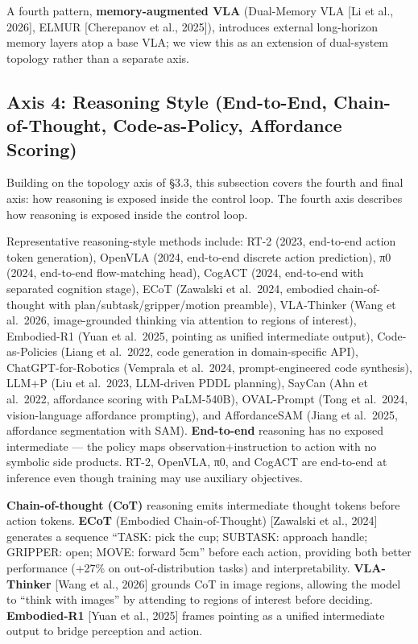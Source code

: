 A fourth pattern, \textbf{memory-augmented VLA} (Dual-Memory VLA {[}Li et al., 2026{]}, ELMUR {[}Cherepanov et al., 2025{]}), introduces external long-horizon memory layers atop a base VLA; we view this as an extension of dual-system topology rather than a separate axis.

\subsection{Axis 4: Reasoning Style (End-to-End, Chain-of-Thought, Code-as-Policy, Affordance Scoring)}\label{axis-4-reasoning-style-end-to-end-chain-of-thought-code-as-policy-affordance-scoring}

Building on the topology axis of §3.3, this subsection covers the fourth and final axis: how reasoning is exposed inside the control loop. The fourth axis describes how reasoning is exposed inside the control loop.

Representative reasoning-style methods include: RT-2 (2023, end-to-end action token generation), OpenVLA (2024, end-to-end discrete action prediction), π0 (2024, end-to-end flow-matching head), CogACT (2024, end-to-end with separated cognition stage), ECoT (Zawalski et al.~2024, embodied chain-of-thought with plan/subtask/gripper/motion preamble), VLA-Thinker (Wang et al.~2026, image-grounded thinking via attention to regions of interest), Embodied-R1 (Yuan et al.~2025, pointing as unified intermediate output), Code-as-Policies (Liang et al.~2022, code generation in domain-specific API), ChatGPT-for-Robotics (Vemprala et al.~2024, prompt-engineered code synthesis), LLM+P (Liu et al.~2023, LLM-driven PDDL planning), SayCan (Ahn et al.~2022, affordance scoring with PaLM-540B), OVAL-Prompt (Tong et al.~2024, vision-language affordance prompting), and AffordanceSAM (Jiang et al.~2025, affordance segmentation with SAM). \textbf{End-to-end} reasoning has no exposed intermediate --- the policy maps observation+instruction to action with no symbolic side products. RT-2, OpenVLA, π0, and CogACT are end-to-end at inference even though training may use auxiliary objectives.

\textbf{Chain-of-thought (CoT)} reasoning emits intermediate thought tokens before action tokens. \textbf{ECoT} (Embodied Chain-of-Thought) {[}Zawalski et al., 2024{]} generates a sequence ``TASK: pick the cup; SUBTASK: approach handle; GRIPPER: open; MOVE: forward 5cm'' before each action, providing both better performance (+27\% on out-of-distribution tasks) and interpretability. \textbf{VLA-Thinker} {[}Wang et al., 2026{]} grounds CoT in image regions, allowing the model to ``think with images'' by attending to regions of interest before deciding. \textbf{Embodied-R1} {[}Yuan et al., 2025{]} frames pointing as a unified intermediate output to bridge perception and action.

